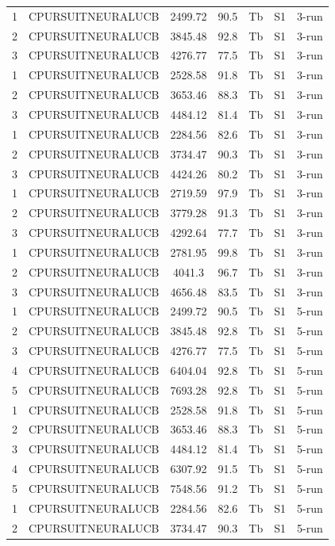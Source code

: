 \documentclass[11pt]{article}
\begin{document}
\begin{center}
\begin{longtable}{|c|c|c|c|c|c|c|}
1 & CPURSUITNEURALUCB & 2499.72 & 90.5 & Tb & S1 & 3-run \\
2 & CPURSUITNEURALUCB & 3845.48 & 92.8 & Tb & S1 & 3-run \\
3 & CPURSUITNEURALUCB & 4276.77 & 77.5 & Tb & S1 & 3-run \\
1 & CPURSUITNEURALUCB & 2528.58 & 91.8 & Tb & S1 & 3-run \\
2 & CPURSUITNEURALUCB & 3653.46 & 88.3 & Tb & S1 & 3-run \\
3 & CPURSUITNEURALUCB & 4484.12 & 81.4 & Tb & S1 & 3-run \\
1 & CPURSUITNEURALUCB & 2284.56 & 82.6 & Tb & S1 & 3-run \\
2 & CPURSUITNEURALUCB & 3734.47 & 90.3 & Tb & S1 & 3-run \\
3 & CPURSUITNEURALUCB & 4424.26 & 80.2 & Tb & S1 & 3-run \\
1 & CPURSUITNEURALUCB & 2719.59 & 97.9 & Tb & S1 & 3-run \\
2 & CPURSUITNEURALUCB & 3779.28 & 91.3 & Tb & S1 & 3-run \\
3 & CPURSUITNEURALUCB & 4292.64 & 77.7 & Tb & S1 & 3-run \\
1 & CPURSUITNEURALUCB & 2781.95 & 99.8 & Tb & S1 & 3-run \\
2 & CPURSUITNEURALUCB & 4041.3 & 96.7 & Tb & S1 & 3-run \\
3 & CPURSUITNEURALUCB & 4656.48 & 83.5 & Tb & S1 & 3-run \\
1 & CPURSUITNEURALUCB & 2499.72 & 90.5 & Tb & S1 & 5-run \\
2 & CPURSUITNEURALUCB & 3845.48 & 92.8 & Tb & S1 & 5-run \\
3 & CPURSUITNEURALUCB & 4276.77 & 77.5 & Tb & S1 & 5-run \\
4 & CPURSUITNEURALUCB & 6404.04 & 92.8 & Tb & S1 & 5-run \\
5 & CPURSUITNEURALUCB & 7693.28 & 92.8 & Tb & S1 & 5-run \\
1 & CPURSUITNEURALUCB & 2528.58 & 91.8 & Tb & S1 & 5-run \\
2 & CPURSUITNEURALUCB & 3653.46 & 88.3 & Tb & S1 & 5-run \\
3 & CPURSUITNEURALUCB & 4484.12 & 81.4 & Tb & S1 & 5-run \\
4 & CPURSUITNEURALUCB & 6307.92 & 91.5 & Tb & S1 & 5-run \\
5 & CPURSUITNEURALUCB & 7548.56 & 91.2 & Tb & S1 & 5-run \\
1 & CPURSUITNEURALUCB & 2284.56 & 82.6 & Tb & S1 & 5-run \\
2 & CPURSUITNEURALUCB & 3734.47 & 90.3 & Tb & S1 & 5-run \\

\end{longtable}
\end{center}
\end{document}
